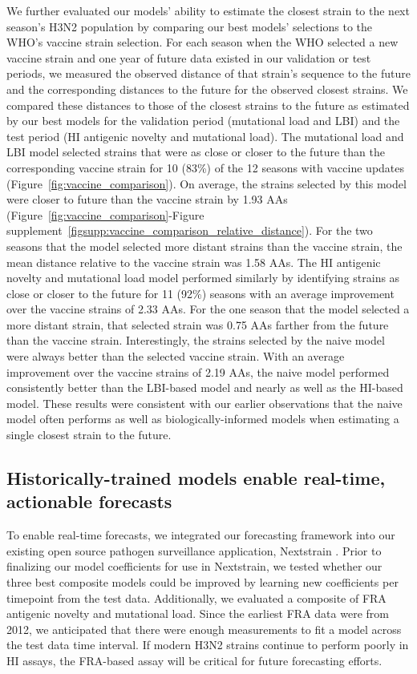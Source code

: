 We further evaluated our models' ability to estimate the closest strain to the next season's H3N2 population by comparing our best models' selections to the WHO's vaccine strain selection.
For each season when the WHO selected a new vaccine strain and one year of future data existed in our validation or test periods, we measured the observed distance of that strain's sequence to the future and the corresponding distances to the future for the observed closest strains.
We compared these distances to those of the closest strains to the future as estimated by our best models for the validation period (mutational load and LBI) and the test period (HI antigenic novelty and mutational load).
The mutational load and LBI model selected strains that were as close or closer to the future than the corresponding vaccine strain for 10 (83\%) of the 12 seasons with vaccine updates (Figure~\ref{fig:vaccine_comparison}).
On average, the strains selected by this model were closer to future than the vaccine strain by 1.93 AAs (Figure~\ref{fig:vaccine_comparison}-Figure supplement~\ref{figsupp:vaccine_comparison_relative_distance}).
For the two seasons that the model selected more distant strains than the vaccine strain, the mean distance relative to the vaccine strain was 1.58 AAs.
The HI antigenic novelty and mutational load model performed similarly by identifying strains as close or closer to the future for 11 (92\%) seasons with an average improvement over the vaccine strains of 2.33 AAs.
For the one season that the model selected a more distant strain, that selected strain was 0.75 AAs farther from the future than the vaccine strain.
Interestingly, the strains selected by the naive model were always better than the selected vaccine strain.
With an average improvement over the vaccine strains of 2.19 AAs, the naive model performed consistently better than the LBI-based model and nearly as well as the HI-based model.
These results were consistent with our earlier observations that the naive model often performs as well as biologically-informed models when estimating a single closest strain to the future.

\subsection*{Historically-trained models enable real-time, actionable forecasts}

To enable real-time forecasts, we integrated our forecasting framework into our existing open source pathogen surveillance application, Nextstrain \citep{Hadfield2018}.
Prior to finalizing our model coefficients for use in Nextstrain, we tested whether our three best composite models could be improved by learning new coefficients per timepoint from the test data.
Additionally, we evaluated a composite of FRA antigenic novelty and mutational load.
Since the earliest FRA data were from 2012, we anticipated that there were enough measurements to fit a model across the test data time interval.
If modern H3N2 strains continue to perform poorly in HI assays, the FRA-based assay will be critical for future forecasting efforts.

